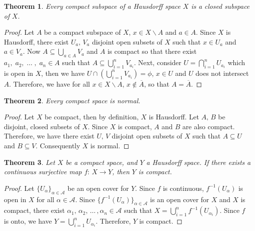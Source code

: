 \documentclass[12pt,oneside,english]{amsbook}
\numberwithin{equation}{section} %
\numberwithin{figure}{section} %
\theoremstyle{plain}
\numberwithin{section}{chapter}
\newtheorem{thm}{Theorem}[section]
\theoremstyle{plain}
\begin{document}
\begin{thm}
  Every compact subspace of a Hausdorff space $X$ is a closed subspace of $X$.
\end{thm}
\begin{proof}
  Let $A$ be a compact subspace of $X$, $x  \in  X \backslash A$ and $a  \in  A$. Since $X$ is Hausdorff, there exist $U_{a}, \, V_{a}$ disjoint open subsets of $X$ such that $x  \in U_{a}$ and $a  \in  V_{a}$. Now $A  \subseteq  \bigcup_{a  \in  A}V_{a}$ and $A$ is compact so that there exist $a_{1}, \; a_{2}, \; \ldots \; , \; a_{n} \in A$ such that $A  \subseteq  \bigcup_{i  =  1}^{n}V_{a_{i}}$. Next, consider $U = \bigcap_{i  =  1}^{n} U_{a_{i}}$ which is open in $X$, then we have $U \cap (\bigcup_{i  =  1}^{n}V_{a_{i}})  =  \phi$, $x \in U$ and $U$ does not intersect $A$. Therefore, we have for all $x  \in  X \backslash A$, $x  \notin  \overline{A}$, so that $A  =  \overline{A}$.
\end{proof}

\begin{thm}
  Every compact space is normal.
\end{thm}
\begin{proof}
  Let $X$ be compact, then by definition, $X$ is Hausdorff. Let $A, \, B$ be disjoint, closed subsets of $X$. Since $X$ is compact, $A$ and $B$ are also compact. Therefore, we have there exist $U, \, V$ disjoint open subsets of $X$ such that $A  \subseteq  U$ and $B  \subseteq  V$. Consequently $X$ is normal.
\end{proof}

\begin{thm}
  Let $X$ be a compact space, and $Y$ a Hausdorff space. If there exists a continuous surjective map $f:\, X \to Y$, then $Y$ is compact.
\end{thm}
\begin{proof}
  Let $\{U_{\alpha} \}_{\alpha  \in  \mathcal{A}}$ be an open cover for $Y$. Since $f$ is continuous, $f^{-1}(U_{\alpha})$ is open in $X$ for all $\alpha  \in  \mathcal{A}$. Since $\{f^{-1}(U_{\alpha}) \}_{\alpha  \in  \mathcal{A}}$ is an open cover for $X$ and $X$ is compact, there exist $\alpha_{1}, \, \alpha_{2}, \, \ldots \, , \alpha_{n} \in \mathcal{A}$ such that $X  =  \bigcup_{ i  =  1}^{n}f^{-1}(U_{\alpha_{i}})$. Since $f$ is onto, we have $Y  =  \bigcup_{i  =  1}^{n}U_{\alpha_{i}}$. Therefore, $Y$ is compact. 
\end{proof}
\end{document}

